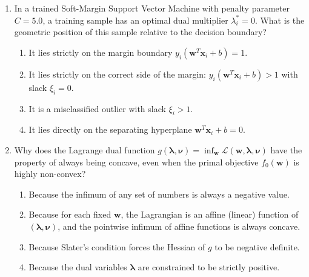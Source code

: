 \begin{enumerate}[label=\textbf{MCQ\arabic*.}]
    \item In a trained Soft-Margin Support Vector Machine with penalty parameter $C = 5.0$, a training sample has an optimal dual multiplier $\lambda_i^* = 0$. What is the geometric position of this sample relative to the decision boundary?
    \begin{enumerate}[label=(\alph*)]
        \item It lies strictly on the margin boundary $y_i(\mathbf{w}^T \mathbf{x}_i + b) = 1$.
        \item It lies strictly on the correct side of the margin: $y_i(\mathbf{w}^T \mathbf{x}_i + b) > 1$ with slack $\xi_i = 0$.
        \item It is a misclassified outlier with slack $\xi_i > 1$.
        \item It lies directly on the separating hyperplane $\mathbf{w}^T \mathbf{x}_i + b = 0$.
    \end{enumerate}

    \item Why does the Lagrange dual function $g(\boldsymbol{\lambda}, \boldsymbol{\nu}) = \inf_{\mathbf{w}} \mathcal{L}(\mathbf{w}, \boldsymbol{\lambda}, \boldsymbol{\nu})$ have the property of always being concave, even when the primal objective $f_0(\mathbf{w})$ is highly non-convex?
    \begin{enumerate}[label=(\alph*)]
        \item Because the infimum of any set of numbers is always a negative value.
        \item Because for each fixed $\mathbf{w}$, the Lagrangian is an affine (linear) function of $(\boldsymbol{\lambda}, \boldsymbol{\nu})$, and the pointwise infimum of affine functions is always concave.
        \item Because Slater's condition forces the Hessian of $g$ to be negative definite.
        \item Because the dual variables $\boldsymbol{\lambda}$ are constrained to be strictly positive.
    \end{enumerate}
\end{enumerate}
